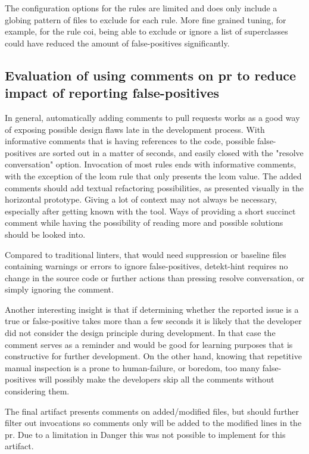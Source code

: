 \documentclass{report}
\begin{document}
The configuration options for the rules are limited and does only include a globing pattern of files to exclude for each rule. More fine grained tuning, for example, for the rule \gls{coi}, being able to exclude or ignore a list of superclasses could have reduced the amount of false-positives significantly.  


\subsection{Evaluation of using comments on \gls{pr} to reduce impact of reporting false-positives}
In general, automatically adding comments to pull requests works as a good way of exposing possible design flaws late in the development process. With informative comments that is having references to the code, possible false-positives are sorted out in a matter of seconds, and easily closed with the "resolve conversation" option. Invocation of most rules ends with informative comments, with the exception of the \gls{lcom} rule that only presents the \gls{lcom} value. The added comments should add textual refactoring possibilities, as presented visually in the horizontal prototype. Giving a lot of context may not always be necessary, especially after getting known with the tool. Ways of providing a short succinct comment while having the possibility of reading more and possible solutions should be looked into.

Compared to traditional linters, that would need suppression or baseline files containing warnings or errors to ignore false-positives, detekt-hint requires no change in the source code or further actions than pressing resolve conversation, or simply ignoring the comment.  

Another interesting insight is that if determining whether the reported issue is a true or false-positive takes more than a few seconds it is likely that the developer did not consider the design principle during development. In that case the comment serves as a reminder and would be good for learning purposes that is constructive for further development. On the other hand, knowing that repetitive manual inspection is a prone to human-failure, or boredom, too many false-positives will possibly make the developers skip all the comments without considering them. 

The final artifact presents comments on added/modified files, but should further filter out invocations so comments only will be added to the modified lines in the \gls{pr}. Due to a limitation in Danger this was not possible to implement for this artifact.
\end{document}
